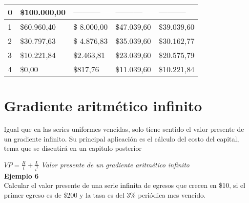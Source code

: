 \begin{itemize}
\begin{itemize}
\begin{spacing}{1.1}
\begin{center}
\begin{tabular}{|p{1cm}|p{2cm}|p{2cm}|p{2cm}|p{3cm}|}
            0 & \$100.000,00 & --------- & --------- & ---------\\ \hline 
            1 & \$60.960,40  &\$ 8.000,00  & \$47.039,60  & \$39.039,60 \\ \hline
            2 & \$30.797,63  &\$ 4.876,83  & \$35.039,60  & \$30.162,77 \\ \hline
            3 & \$10.221,84 & \$2.463,81  & \$23.039,60 & \$20.575,79 \\ \hline
            4 & \$0,00  & \$817,76  & \$11.039,60  & \$10.221,84 \\ \hline

 
\end{tabular}
\end{center}
\end{spacing}
		\end{itemize}
	\end{itemize}
	
	\section{Gradiente aritmético infinito}
	Igual que en las series uniformes vencidas, solo tiene sentido el valor presente de un gradiente 	infinito. Su principal aplicación es el cálculo del costo del capital, tema que se discutirá en un capitulo posterior
	
	$VP = \frac{R}{i} + \frac{L}{i^2}$ \hspace{35 pt} \textit{Valor presente de un gradiente aritmético infinito}\\
	
	\textbf{Ejemplo 6}\\
	Calcular el valor presente de una serie infinita de egresos que crecen en \$10, si el primer egreso es de \$200 y la tasa es del 3\% periódica mes vencido.\\
	
